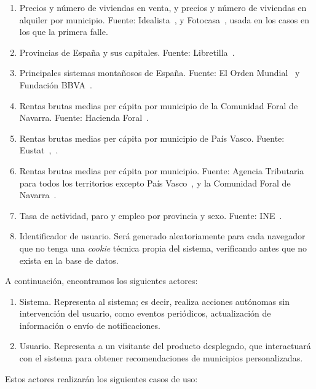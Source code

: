 \begin{enumerate}
    \item Precios y número de viviendas en venta, y precios y número de viviendas en alquiler por municipio. Fuente: Idealista~\cite{idealista}, y Fotocasa~\cite{fotocasa}, usada en los casos en los que la primera falle.
    \item Provincias de España y sus capitales. Fuente: Libretilla~\cite{provincias}.
    \item Principales sistemas montañosos de España. Fuente: El Orden Mundial~\cite{relieve} y Fundación BBVA~\cite{rugosidad}.
    \item Rentas brutas medias per cápita por municipio de la Comunidad Foral de Navarra. Fuente: Hacienda Foral~\cite{renta_navarra}.
    \item Rentas brutas medias per cápita por municipio de País Vasco. Fuente: Eustat~\cite{renta_euskadi},~\cite{PIB_pais_vasco}.
    \item Rentas brutas medias per cápita por municipio. Fuente: Agencia Tributaria para todos los territorios excepto País Vasco~\cite{renta}, y la Comunidad Foral de Navarra~\cite{renta_navarra}.
    \item Tasa de actividad, paro y empleo por provincia y sexo. Fuente: INE~\cite{INE_empleo}.
    \item Identificador de usuario. Será generado aleatoriamente para cada navegador que no tenga una \textit{cookie} técnica propia del sistema, verificando antes que no exista en la base de datos.
\end{enumerate}

A continuación, encontramos los siguientes actores:

\begin{enumerate}
    \item Sistema. Representa al sistema; es decir, realiza acciones autónomas sin intervención del usuario, como eventos periódicos, actualización de información o envío de notificaciones.
    \item Usuario. Representa a un visitante del producto desplegado, que interactuará con el sistema para obtener recomendaciones de municipios personalizadas.
\end{enumerate}

Estos actores realizarán los siguientes casos de uso:

